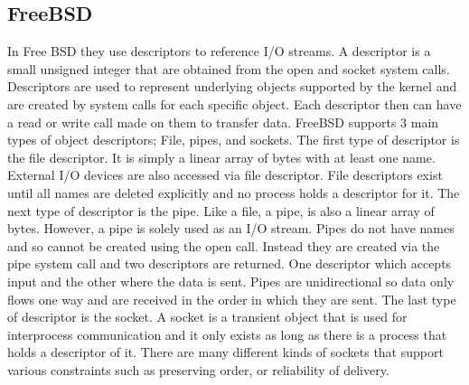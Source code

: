 \documentclass[a4paper,10pt,onecolumn]{article}
\begin{document}
\subsection{FreeBSD}
In Free BSD they use descriptors to reference I/O streams. A descriptor is a small unsigned integer that are obtained from the open and socket system calls. Descriptors are used to represent underlying objects supported by the kernel and are created by system calls for each specific object. Each descriptor then can have a read or write call made on them to transfer data. FreeBSD supports 3 main types of object descriptors; File, pipes, and sockets.
\newline
The first type of descriptor is the file descriptor. It is simply a linear array of bytes with at least one name. External I/O devices are also accessed via file descriptor. File descriptors exist until all names are deleted explicitly and no process holds a descriptor for it. 
\newline
The next type of descriptor is the pipe. Like a file, a pipe, is also a linear array of bytes. However, a pipe is solely used as an I/O stream. Pipes do not have names and so cannot be created using the open call. Instead they are created via the pipe system call and two descriptors are returned. One descriptor which accepts input and the other where the data is sent. Pipes are unidirectional so data only flows one way and are received in the order in which they are sent.
\newline
The last type of descriptor is the socket. A socket is a transient object that is used for interprocess communication and it only exists as long as there is a process that holds a descriptor of it. There are many different kinds of sockets that support various constraints such as preserving order, or reliability of delivery.
\newline
\newline
\end{document}
